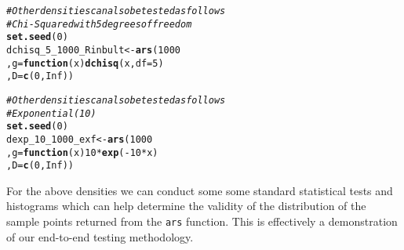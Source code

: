 \documentclass{article}\usepackage[]{graphicx}\usepackage[]{color}
\makeatletter
\newcommand{\hlnum}[1]{\textcolor[rgb]{0.686,0.059,0.569}{#1}}%
\newcommand{\hlcom}[1]{\textcolor[rgb]{0.678,0.584,0.686}{\textit{#1}}}%
\newcommand{\hlopt}[1]{\textcolor[rgb]{0,0,0}{#1}}%
\newcommand{\hlstd}[1]{\textcolor[rgb]{0.345,0.345,0.345}{#1}}%
\newcommand{\hlkwa}[1]{\textcolor[rgb]{0.161,0.373,0.58}{\textbf{#1}}}%
\newcommand{\hlkwb}[1]{\textcolor[rgb]{0.69,0.353,0.396}{#1}}%
\newcommand{\hlkwc}[1]{\textcolor[rgb]{0.333,0.667,0.333}{#1}}%
\newcommand{\hlkwd}[1]{\textcolor[rgb]{0.737,0.353,0.396}{\textbf{#1}}}%
\newenvironment{kframe}{%
 \def\at@end@of@kframe{}%
 \ifinner\ifhmode%
  \def\at@end@of@kframe{\end{minipage}}%
  \begin{minipage}{\columnwidth}%
 \fi\fi%
 \def\FrameCommand##1{\hskip\@totalleftmargin \hskip-\fboxsep
 \colorbox{shadecolor}{##1}\hskip-\fboxsep
     \hskip-\linewidth \hskip-\@totalleftmargin \hskip\columnwidth}%
 \MakeFramed {\advance\hsize-\width
   \@totalleftmargin\z@ \linewidth\hsize
   \@setminipage}}%
 {\par\unskip\endMakeFramed%
 \at@end@of@kframe}
\newenvironment{knitrout}{}{} %
\makeatother
\begin{document}
\begin{knitrout}
\begin{kframe}
\begin{alltt}
 \hlcom{# Other densities can also be tested as follows}
 \hlcom{# Chi-Squared with 5 degrees of freedom}
 \hlkwd{set.seed}\hlstd{(}\hlnum{0}\hlstd{)}
 \hlstd{dchisq_5_1000_Rinbult} \hlkwb{<-} \hlkwd{ars}\hlstd{(}\hlnum{1000}
                              \hlstd{,} \hlkwc{g} \hlstd{=} \hlkwa{function}\hlstd{(}\hlkwc{x}\hlstd{)} \hlkwd{dchisq}\hlstd{(x,} \hlkwc{df} \hlstd{=} \hlnum{5}\hlstd{)}
                              \hlstd{,} \hlkwc{D} \hlstd{=} \hlkwd{c}\hlstd{(}\hlnum{0}\hlstd{,} \hlnum{Inf}\hlstd{))}

 \hlcom{# Other densities can also be tested as follows}
 \hlcom{# Exponential(10)}
 \hlkwd{set.seed}\hlstd{(}\hlnum{0}\hlstd{)}
 \hlstd{dexp_10_1000_exf} \hlkwb{<-} \hlkwd{ars}\hlstd{(}\hlnum{1000}
                         \hlstd{,} \hlkwc{g} \hlstd{=} \hlkwa{function}\hlstd{(}\hlkwc{x}\hlstd{)} \hlnum{10}\hlopt{*}\hlkwd{exp}\hlstd{(}\hlopt{-}\hlnum{10}\hlopt{*}\hlstd{x)}
                         \hlstd{,} \hlkwc{D}\hlstd{=}\hlkwd{c}\hlstd{(}\hlnum{0}\hlstd{,} \hlnum{Inf}\hlstd{))}
\end{alltt}
\end{kframe}
\end{knitrout}

For the above densities we can conduct some some standard statistical tests and 
histograms which can help determine the validity of the distribution of the sample 
points returned from the \texttt{ars} function. This is effectively a demonstration of 
our end-to-end testing methodology.
\end{document}

